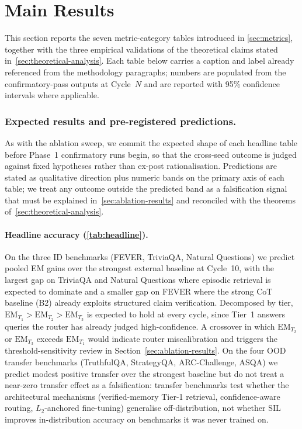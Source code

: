 \section{Main Results}
\label{sec:main-results}

This section reports the seven metric-category tables introduced in
\cref{sec:metrics}, together with the three empirical validations of
the theoretical claims stated in~\cref{sec:theoretical-analysis}.
Each table below carries a caption and label already referenced from
the methodology paragraphs; numbers are populated from the
confirmatory-pass outputs at Cycle~$N$ and are reported with 95\%
confidence intervals where applicable.

\subsubsection*{Expected results and pre-registered predictions.}
As with the ablation sweep, we commit the expected shape of each
headline table before Phase~1 confirmatory runs begin, so that the
cross-seed outcome is judged against fixed hypotheses rather than
ex-post rationalisation. Predictions are stated as qualitative
direction plus numeric bands on the primary axis of each table; we
treat any outcome outside the predicted band as a falsification
signal that must be explained in~\cref{sec:ablation-results} and
reconciled with the theorems of~\cref{sec:theoretical-analysis}.

\paragraph{Headline accuracy (\cref{tab:headline}).}
On the three ID benchmarks (FEVER, TriviaQA, Natural Questions) we predict pooled EM gains over the strongest external baseline at Cycle~10, with the largest gap on TriviaQA and Natural Questions where episodic retrieval is expected to dominate and a smaller gap on FEVER where the strong CoT baseline (B2) already exploits structured claim verification. Decomposed by tier, $\mathrm{EM}_{T_{1}} > \mathrm{EM}_{T_{2}} > \mathrm{EM}_{T_{3}}$ is expected to hold at every cycle, since Tier~1 answers queries the router has already judged high-confidence. A crossover in which $\mathrm{EM}_{T_{2}}$ or $\mathrm{EM}_{T_{3}}$ exceeds $\mathrm{EM}_{T_{1}}$ would indicate router miscalibration and triggers the threshold-sensitivity review in Section~\ref{sec:ablation-results}. On the four OOD transfer benchmarks (TruthfulQA, StrategyQA, ARC-Challenge, ASQA) we predict modest positive transfer over the strongest baseline but do not treat a near-zero transfer effect as a falsification: transfer benchmarks test whether the architectural mechanisms (verified-memory Tier-1 retrieval, confidence-aware routing, $L_{2}$-anchored fine-tuning) generalise off-distribution, not whether SIL improves in-distribution accuracy on benchmarks it was never trained on.

